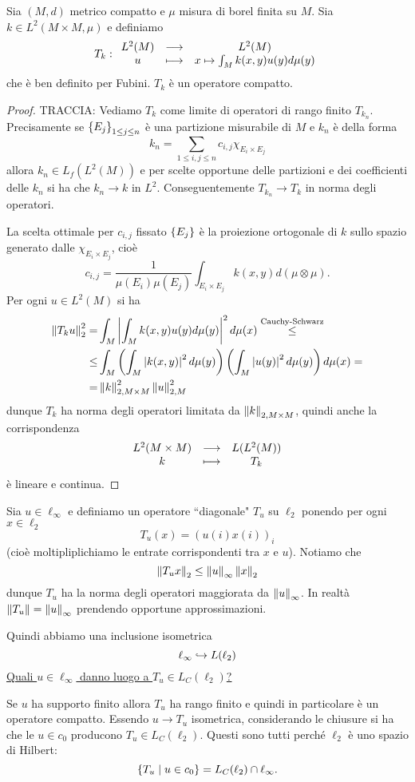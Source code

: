 \begin{exercise}
Sia $(M,d)$ metrico compatto e $\mu$ misura di borel finita su $M$. Sia $k\in L^2(M\times M,\mu)$ e definiamo
\[T_k:\begin{array}{ccc} {L^2(M)} & \longrightarrow & {L^2(M)}\\ {u} & \longmapsto & {x\mapsto\int_M k(x,y)u(y)d\mu(y)} \end{array}\]
che \`e ben definito per Fubini. $T_k$ \`e un operatore compatto.
\end{exercise}
\begin{proof}
TRACCIA:
Vediamo $T_k$ come limite di operatori di rango finito $T_{k_n}$. Precisamente se $\left\{{E_j}\right\}_{1\leq j\leq n}$ \`e una partizione misurabile di $M$ e $k_n$ \`e della forma 
\[k_n=\sum_{1\leq i,j\leq n}c_{i,j}\chi_{E_i\times E_j}\]
allora $k_n\in L_f(L^2(M))$ e per scelte opportune delle partizioni e dei coefficienti delle $k_n$ si ha che $k_n\to k$ in $L^2$. Conseguentemente $T_{k_n}\to T_k$ in norma degli operatori.

La scelta ottimale per $c_{i,j}$ fissato $\left\{{E_j}\right\}$ \`e la proiezione ortogonale di $k$ sullo spazio generato dalle $\chi_{E_i\times E_j}$, cio\`e
\[c_{i,j}=\frac1{\mu(E_i)\mu(E_j)}\int_{E_i\times E_j}k(x,y)d(\mu\otimes\mu).\]
Per ogni $u\in L^2(M)$ si ha
\begin{align*}
    \left\Vert{T_k u}\right\Vert_2^2=&\int_M\left|{\int_M k(x,y)u(y)d\mu(y)}\right|^2d\mu(x)\overset{\text{Cauchy-Schwarz}}\leq\\
    \leq&\int_M\left({\int_M \left|{k(x,y)}\right|^2d\mu(y)}\right)\left({\int_M \left|{u(y)}\right|^2d\mu(y)}\right)d\mu(x)=\\
    =&\left\Vert{k}\right\Vert_{2,M\times M}^2\left\Vert{u}\right\Vert_{2,M}^2
\end{align*}
dunque $T_k$ ha norma degli operatori limitata da $\left\Vert{k}\right\Vert_{2,M\times M}$, quindi anche la corrispondenza
\[\begin{array}{ccc} {L^2(M\times M)} & \longrightarrow & {L(L^2(M))}\\ {k} & \longmapsto & {T_k} \end{array}\]
\`e lineare e continua.
\end{proof}


\begin{example}
Sia $u\in \ell_\infty$ e definiamo un operatore ``{diagonale}" $T_u$ su $\ell_2$ ponendo per ogni $x\in \ell_2$
\[T_u(x)=(u(i)x(i))_{i}\]
(cio\`e moltipliplichiamo le entrate corrispondenti tra $x$ e $u$). Notiamo che
\[\left\Vert{T_u x}\right\Vert_2\leq \left\Vert{u}\right\Vert_\infty\left\Vert{x}\right\Vert_2\]
dunque $T_u$ ha la norma degli operatori maggiorata da $\left\Vert{u}\right\Vert_\infty$. In realt\`a $\left\Vert{T_u}\right\Vert=\left\Vert{u}\right\Vert_\infty$ prendendo opportune approssimazioni.

Quindi abbiamo una inclusione isometrica
\[\ell_\infty\hookrightarrow L(\ell_2)\]
\ul{Quali $u\in \ell_\infty$ danno luogo a $T_u\in L_C(\ell_2)$? }\smallskip

Se $u$ ha supporto finito allora $T_u$ ha rango finito e quindi in particolare \`e un operatore compatto. Essendo $u\to T_u$ isometrica, considerando le chiusure si ha che le $u\in c_0$ producono $T_u\in L_C(\ell_2)$. Questi sono tutti perch\'e $\ell_2$ \`e uno spazio di Hilbert:
\[\left\{{T_u\mid u\in c_0}\right\}=L_C(\ell_2)\cap\ell_\infty.\]
\end{example}



